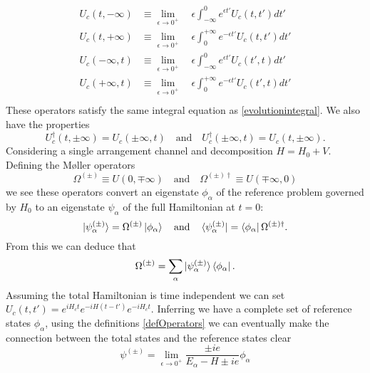 \documentclass[11pt]{article}
\numberwithin{equation}{section}
\begin{document}
\begin{align}\label{defOperators}
\begin{split}
	U_c(t,-\infty) &\equiv \underset{\epsilon \rightarrow 0^+} \lim \quad\epsilon \int^0_{-\infty} e^{\epsilon t'} U_c(t,t')dt'\\
	U_c(t,+\infty) &\equiv \underset{\epsilon \rightarrow 0^+} \lim \quad\epsilon \int_0^{+\infty} e^{-\epsilon t'} U_c(t,t')dt'\\
	U_c(-\infty,t) &\equiv \underset{\epsilon \rightarrow 0^+} \lim \quad\epsilon \int^0_{-\infty} e^{\epsilon t'} U_c(t',t)dt'\\
	U_c(+\infty,t) &\equiv \underset{\epsilon \rightarrow 0^+} \lim \quad\epsilon \int_0^{+\infty} e^{-\epsilon t'} U_c(t',t)dt'\\
\end{split}
\end{align}
These operators satisfy the same integral equation as \eqref{evolutionintegral}. We also have the properties
\begin{equation}
U_c^{\dagger} (t,\pm \infty	) = U_c(\pm \infty,t) \quad \mbox{and} \quad U_c^{\dagger} (\pm \infty,t ) = U_c(t,\pm \infty).
\end{equation}
 Considering a single arrangement channel and decomposition $H = H_0 + V$. Defining the M\o ller operators
\begin{equation}
	\Omega^{(\pm)} \equiv U(0,\mp \infty) \quad \mbox{and} \quad  \Omega^{(\pm)\dagger} \equiv U(\mp \infty, 0)
\end{equation}
we see these operators convert an eigenstate $\phi_{\alpha}$ of the reference problem governed by $H_0$ to an eigenstate $\psi_{\alpha}$ of the full Hamiltonian at $t = 0$:
\begin{equation}\label{conversion}
\ket{\psi^{(\pm)}_\alpha} = 	\Omega^{(\pm)} \ket{\phi_{\alpha}} \quad\mbox{and} \quad \bra{\psi^{(\pm)}_\alpha} = 	 \bra{\phi_{\alpha}}\Omega^{(\pm) \dagger}.
\end{equation}
From this we can deduce that
\begin{equation}
	\Omega^{(\pm)} = \underset{\alpha} \sum \ket{\psi^{(\pm)}_\alpha} \bra{\phi_{\alpha}}.
\end{equation}
Assuming the total Hamiltonian is time independent we can set $U_c(t,t') = e^{iH_ct}e^{-iH(t-t')}e^{-iH_ct}$. Inferring we have a complete set of reference states $\phi_{\alpha}$, using the definitions \eqref{defOperators} we can eventually make the connection between the total states and the reference states clear
\begin{equation}
\psi^{(\pm)} = \underset{\epsilon \rightarrow 0^+} \lim \frac{\pm ie}{E_{\alpha} - H \pm ie}\phi_{\alpha}
\end{equation}
\end{document}
